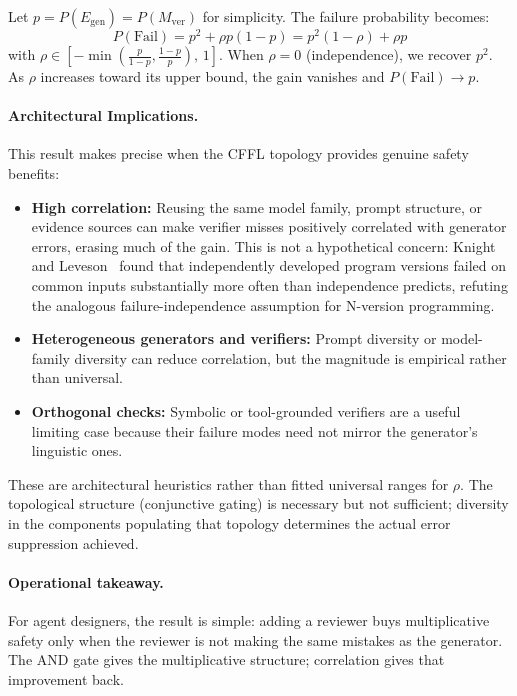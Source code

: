 \begin{corollary}\label{cor:correlation-degradation}
Let $p = P(E_{\mathrm{gen}}) = P(M_{\mathrm{ver}})$ for simplicity. The failure probability becomes:
\[
P(\mathrm{Fail}) = p^2 + \rho p(1-p) = p^2(1-\rho) + \rho p
\]
with $\rho \in \left[-\min\!\left(\frac{p}{1-p},\frac{1-p}{p}\right),\,1\right]$. When $\rho = 0$ (independence), we recover $p^2$. As $\rho$ increases toward its upper bound, the gain vanishes and $P(\mathrm{Fail}) \to p$.
\end{corollary}

\paragraph{Architectural Implications.}
This result makes precise when the CFFL topology provides genuine safety benefits:
\begin{itemize}[leftmargin=*]
\item \textbf{High correlation:} Reusing the same model family, prompt structure, or evidence sources can
make verifier misses positively correlated with generator errors, erasing much of the gain. This is not a
hypothetical concern: Knight and Leveson~\cite{knight1986} found that independently developed program versions
failed on common inputs substantially more often than independence predicts, refuting the analogous
failure-independence assumption for N-version programming.
\item \textbf{Heterogeneous generators and verifiers:} Prompt diversity or model-family diversity can
reduce correlation, but the magnitude is empirical rather than universal.
\item \textbf{Orthogonal checks:} Symbolic or tool-grounded verifiers are a useful limiting case because
their failure modes need not mirror the generator's linguistic ones.
\end{itemize}
These are architectural heuristics rather than fitted universal ranges for $\rho$. The topological structure
(conjunctive gating) is necessary but not sufficient; diversity in the components populating that topology
determines the actual error suppression achieved.

\paragraph{Operational takeaway.}
For agent designers, the result is simple: adding a reviewer buys multiplicative safety only when the reviewer is not making the same mistakes as the generator. The AND gate gives the multiplicative structure; correlation gives that improvement back.

